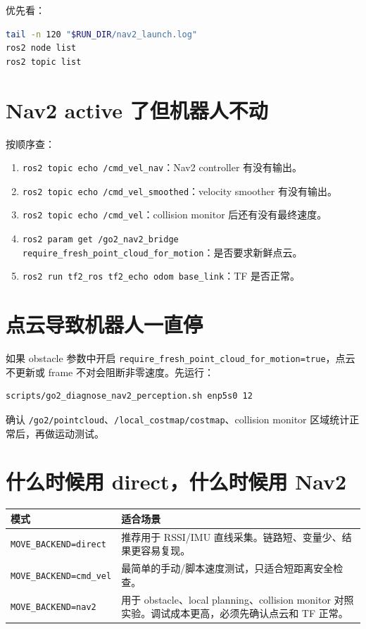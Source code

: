 \documentclass[UTF8,11pt,a4paper,openany]{ctexrep}
\newcommand{\code}[1]{\nolinkurl{#1}}
\newcommand{\topic}[1]{\nolinkurl{#1}}
\newcommand{\param}[1]{\nolinkurl{#1}}
\begin{document}
优先看：

\begin{lstlisting}[language=bash]
tail -n 120 "$RUN_DIR/nav2_launch.log"
ros2 node list
ros2 topic list
\end{lstlisting}

\section{Nav2 active 了但机器人不动}

按顺序查：

\begin{enumerate}
  \item \code{ros2 topic echo /cmd_vel_nav}：Nav2 controller 有没有输出。
  \item \code{ros2 topic echo /cmd_vel_smoothed}：velocity smoother 有没有输出。
  \item \code{ros2 topic echo /cmd_vel}：collision monitor 后还有没有最终速度。
  \item \code{ros2 param get /go2_nav2_bridge require_fresh_point_cloud_for_motion}：是否要求新鲜点云。
  \item \code{ros2 run tf2_ros tf2_echo odom base_link}：TF 是否正常。
\end{enumerate}

\section{点云导致机器人一直停}

如果 obstacle 参数中开启 \param{require_fresh_point_cloud_for_motion=true}，点云不更新或 frame 不对会阻断非零速度。先运行：

\begin{lstlisting}[language=bash]
scripts/go2_diagnose_nav2_perception.sh enp5s0 12
\end{lstlisting}

确认 \topic{/go2/pointcloud}、\topic{/local_costmap/costmap}、collision monitor 区域统计正常后，再做运动测试。

\section{什么时候用 direct，什么时候用 Nav2}

\begin{longtable}{L{0.24\textwidth} L{0.62\textwidth}}
\toprule
\textbf{模式} & \textbf{适合场景} \\
\midrule
\endhead
\code{MOVE_BACKEND=direct} & 推荐用于 RSSI/IMU 直线采集。链路短、变量少、结果更容易复现。\\
\code{MOVE_BACKEND=cmd_vel} & 最简单的手动/脚本速度测试，只适合短距离安全检查。\\
\code{MOVE_BACKEND=nav2} & 用于 obstacle、local planning、collision monitor 对照实验。调试成本更高，必须先确认点云和 TF 正常。\\
\bottomrule
\end{longtable}
\end{document}
